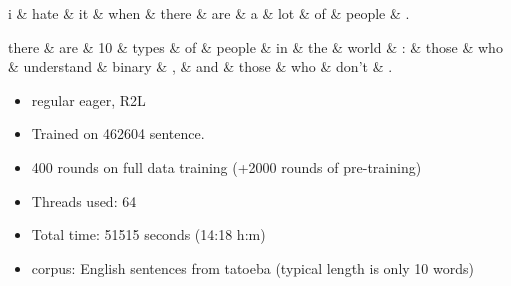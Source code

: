 \documentclass[12pt]{extarticle}
\begin{document}
\begin{dependency}[theme = simple]
\begin{deptext}[column sep=1em]
     i \& hate \& it \& when \& there \& are \& a \& lot \& of \& people \& .  \\
\end{deptext}
\end{dependency}

\scriptsize
\begin{dependency}[theme = simple]
\begin{deptext}[column sep=1em]
     there \& are \& 10 \& types \& of \& people \& in \& the \& world \& : \& those \& who \& understand \& binary \& , \& and \& those \& who \& don't \& .  \\
\end{deptext}
\end{dependency}

\vfill
\begin{center}
\begin{minipage}{4in}
\begin{itemize}
\item regular eager, R2L
\item Trained on 462604 sentence.    
\item 400 rounds on full data training (+2000 rounds of pre-training)
\item Threads used: 64
\item Total time: 51515 seconds  (14:18 h:m)
\item corpus: English sentences from tatoeba (typical length is only
10 words)
\end{itemize}
\end{minipage}
\end{center}
\end{document}
